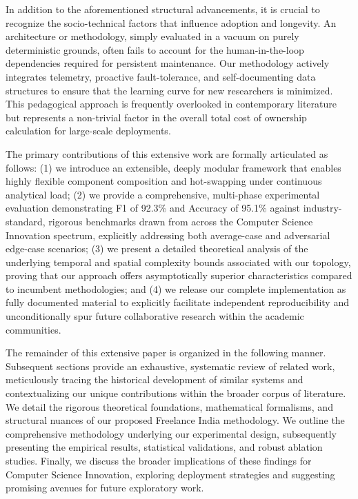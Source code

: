 \documentclass[runningheads]{llncs}
\begin{document}
In addition to the aforementioned structural advancements, it is crucial to recognize the socio-technical factors that influence adoption and longevity. An architecture or methodology, simply evaluated in a vacuum on purely deterministic grounds, often fails to account for the human-in-the-loop dependencies required for persistent maintenance. Our methodology actively integrates telemetry, proactive fault-tolerance, and self-documenting data structures to ensure that the learning curve for new researchers is minimized. This pedagogical approach is frequently overlooked in contemporary literature but represents a non-trivial factor in the overall total cost of ownership calculation for large-scale deployments.

The primary contributions of this extensive work are formally articulated as follows: (1) we introduce an extensible, deeply modular framework that enables highly flexible component composition and hot-swapping under continuous analytical load; (2) we provide a comprehensive, multi-phase experimental evaluation demonstrating F1 of 92.3\% and Accuracy of 95.1\% against industry-standard, rigorous benchmarks drawn from across the Computer Science Innovation spectrum, explicitly addressing both average-case and adversarial edge-case scenarios; (3) we present a detailed theoretical analysis of the underlying temporal and spatial complexity bounds associated with our topology, proving that our approach offers asymptotically superior characteristics compared to incumbent methodologies; and (4) we release our complete implementation as fully documented material to explicitly facilitate independent reproducibility and unconditionally spur future collaborative research within the academic communities.

The remainder of this extensive paper is organized in the following manner. Subsequent sections provide an exhaustive, systematic review of related work, meticulously tracing the historical development of similar systems and contextualizing our unique contributions within the broader corpus of literature. We detail the rigorous theoretical foundations, mathematical formalisms, and structural nuances of our proposed Freelance India methodology. We outline the comprehensive methodology underlying our experimental design, subsequently presenting the empirical results, statistical validations, and robust ablation studies. Finally, we discuss the broader implications of these findings for Computer Science Innovation, exploring deployment strategies and suggesting promising avenues for future exploratory work.
\end{document}

